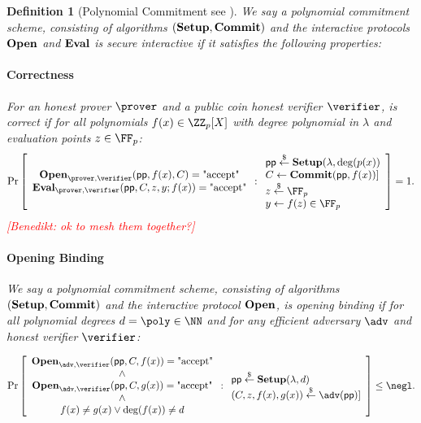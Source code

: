 \documentclass{article}
\newtheorem{definition}{Definition}
\newcommand{\benedikt}[1]{{\textcolor{red}{[Benedikt: #1]}}}
\newcommand{\benedikt}[1]{}
\begin{document}
\begin{definition}[Polynomial Commitment see \cite{AC:KatZavGol10} ]
We say a polynomial commitment scheme, consisting of algorithms $(\textbf{{Setup}},\textbf{{Commit}})$ and the interactive protocols $\textbf{{Open}}$ and $\textbf{{Eval}}$ is secure interactive if it satisfies the following properties:
\paragraph{Correctness}
For an honest prover $\prover$ and a public coin honest verifier $\verifier$, is correct if for all polynomials $f(x)\in \ZZ_p[X]$ with degree polynomial in $\lambda$ and evaluation points $z\in \FF_p$:
	\[        
                \Pr\left[\begin{array}{c}\open_{\prover,\verifier}(\crs,f(x),C)=\text{"accept"}\\
                \eval_{\prover,\verifier}(\crs,C,z,y;f(x))=\text{"accept"}
                \end{array}  : 
                \begin{array}{l} 
                      \crs \sample \setup(\lambda, \deg(p(x)) \\
                      C\gets \commit(\crs,f(x))]\\
               z\sample \FF_p\\
                      y\gets f(z) \in \FF_p
                \end{array} 
        \right] =1.
\]
\benedikt{ok to mesh them together?}
\paragraph{Opening Binding}
We say a polynomial commitment scheme, consisting of algorithms $(\textbf{{Setup}},\textbf{{Commit}})$ and the interactive protocol $\textbf{{Open}}$, is opening binding if for all polynomial degrees $d=\poly\in \NN$ and for any efficient adversary $\adv$ and honest verifier $\verifier$:

	\[        
                \Pr\left[\begin{array}{c}\open_{\adv,\verifier}(\crs,C,f(x))=\text{"accept"}\\
                \wedge\\
           \open_{\adv,\verifier}(\crs,C,g(x))=\text{"accept"}\\
                \wedge\\
                f(x)\neq g(x) \vee \deg(f(x))\neq d\end{array}  : 
                \begin{array}{l} 
                      \crs \sample \setup(\lambda, d) \\
                      (C,z,f(x),g(x))\sample \adv(\crs)]
                \end{array} 
        \right] \leq \negl.
\]

\end{definition}
\end{document}
